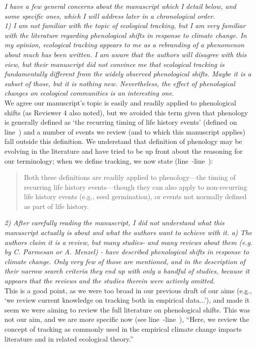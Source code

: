 \documentclass[11pt]{article}
\newcommand{\lr}[1]{line~\lineref{#1}}
\begin{document}
\emph{I have a few general concerns about the manuscript which I detail below, and some specific
ones, which I will address later in a chronological order.\\
1) I am not familiar with the topic of ecological tracking, but I am very familiar with the
literature regarding phenological shifts in response to climate change. In my opinion,
ecological tracking appears to me as a rebranding of a phenomenon about much has been
written. I am aware that the authors will disagree with this view, but their manuscript did
not convince me that ecological tracking is fundamentally different from the widely observed
phenological shifts. Maybe it is a subset of those, but it is nothing new. Nevertheless, the
effect of phenological changes on ecological communities is an interesting one.
}\\

We agree our manuscript's topic is easily and readily applied to phenological shifts (as Reviewer 4 also noted), but we avoided this term given that phenology is generally defined as `the recurring timing of life history events' (defined on \lr{phendefine1}) and a number of events we review (and to which this manuscript applies) fall outside this definition. We understand that definition of phenology may be evolving in the literature and have tried to be up front about the reasoning for our terminology; when we define tracking, we now state (\lr{phendefineS}-\lr{phendefineE}):  
\begin{quote}
Both these definitions are readily applied to phenology---the timing of recurring life history events---though they can also apply to non-recurring life history events (e.g., seed germination), or events not normally defined as part of life history.
\end{quote}


\emph{2) After carefully reading the manuscript, I did not understand what this manuscript actually
is about and what the authors want to achieve with it.
a) The authors claim it is a review, but many studies- and many reviews about them (e.g. by
C. Parmesan or A. Menzel) - have described phenological shifts in response to climate change.
Only very few of those are mentioned, and in the description of their narrow search criteria
they end up with only a handful of studies, because it appears that the reviews and the
studies therein were actively omitted.}\\

This is a good point, as we were too broad in our previous draft of our aims (e.g., `we review current knowledge on tracking both in empirical data...'), and made it seem we were aiming to review the full literature on phenological shifts. This was not our aim, and we are more specific now (see \lr{aimS}-\lr{aimE}), ``Here, we review the concept of tracking as commonly used in the empirical climate change impacts literature and in related ecological theory.''\\
\end{document}
